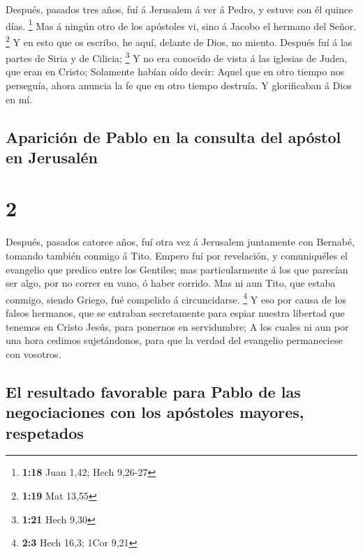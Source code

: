 Después, pasados tres años, fuí á Jerusalem á ver á
Pedro, y estuve con él quince días. \footnote{\textbf{1:18} Juan 1,42;
  Hech 9,26-27}  Mas á ningún otro de los apóstoles vi,
sino á Jacobo el hermano del Señor. \footnote{\textbf{1:19} Mat 13,55}
 Y en esto que os escribo, he aquí, delante de Dios, no
miento.  Después fuí á las partes de Siria y de Cilicia;
\footnote{\textbf{1:21} Hech 9,30}  Y no era conocido de
vista á las iglesias de Judea, que eran en Cristo; 
Solamente habían oído decir: Aquel que en otro tiempo nos perseguía,
ahora anuncia la fe que en otro tiempo destruía.  Y
glorificaban á Dios en mí.

\hypertarget{apariciuxf3n-de-pablo-en-la-consulta-del-apuxf3stol-en-jerusaluxe9n}{%
\subsection{Aparición de Pablo en la consulta del apóstol en
Jerusalén}\label{apariciuxf3n-de-pablo-en-la-consulta-del-apuxf3stol-en-jerusaluxe9n}}

\hypertarget{section-1}{%
\section{2}\label{section-1}}

 Después, pasados catorce años, fuí otra vez á Jerusalem
juntamente con Bernabé, tomando también conmigo á Tito. 
Empero fuí por revelación, y comuniquéles el evangelio que predico entre
los Gentiles; mas particularmente á los que parecían ser algo, por no
correr en vano, ó haber corrido.  Mas ni aun Tito, que
estaba conmigo, siendo Griego, fué compelido á circuncidarse.
\footnote{\textbf{2:3} Hech 16,3; 1Cor 9,21}  Y eso por
causa de los falsos hermanos, que se entraban secretamente para espiar
nuestra libertad que tenemos en Cristo Jesús, para ponernos en
servidumbre;  A los cuales ni aun por una hora cedimos
sujetándonos, para que la verdad del evangelio permaneciese con
vosotros.

\hypertarget{el-resultado-favorable-para-pablo-de-las-negociaciones-con-los-apuxf3stoles-mayores-respetados}{%
\subsection{El resultado favorable para Pablo de las negociaciones con
los apóstoles mayores,
respetados}\label{el-resultado-favorable-para-pablo-de-las-negociaciones-con-los-apuxf3stoles-mayores-respetados}}


